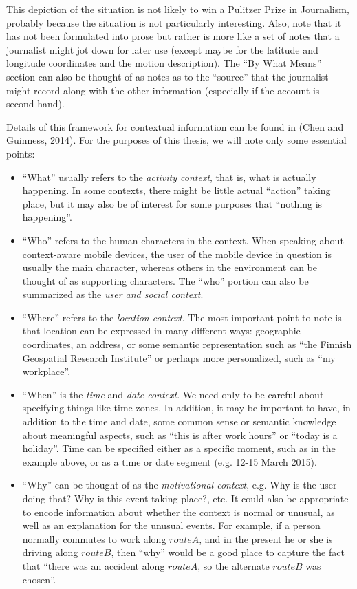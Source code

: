 This depiction of the situation is not likely to win a Pulitzer Prize in Journalism, probably because the situation is not particularly interesting. Also, note that it has not been formulated into prose but rather is more like a set of notes that a journalist might jot down for later use (except maybe for the latitude and longitude coordinates and the motion description). The ``By What Means'' section can also be thought of as notes as to the ``source'' that the journalist might record along with the other information (especially if the account is second-hand).

Details of this framework for contextual information can be found in (Chen and Guinness, 2014). For the purposes of this thesis, we will note only some essential points:
%
\begin{itemize}
\item ``What'' usually refers to the \emph{activity context}, that is, what is actually happening. In some contexts, there might be little actual ``action'' taking place, but it may also be of interest for some purposes that ``nothing is happening''.
% 
\item ``Who'' refers to the human characters in the context. When speaking about context-aware mobile devices, the user of the mobile device in question is usually the main character, whereas others in the environment can be thought of as supporting characters. The ``who'' portion can also be summarized as the \emph{user and social context}. 
%
\item ``Where'' refers to the \emph{location context}. The most important point to note is that location can be expressed in many different ways: geographic coordinates, an address, or some semantic representation such as ``the Finnish Geospatial Research Institute'' or perhaps more personalized, such as ``my workplace''.
%
\item ``When'' is the \emph{time} and \emph{date context}. We need only to be careful about specifying things like time zones. In addition, it may be important to have, in addition to the time and date, some common sense or semantic knowledge about meaningful aspects, such as ``this is after work hours'' or ``today is a holiday''. Time can be specified either as a specific moment, such as in the example above, or as a time or date segment (e.g. 12-15 March 2015).
%
\item ``Why'' can be thought of as the \emph{motivational context}, e.g. Why is the user doing that? Why is this event taking place?, etc. It could also be appropriate to encode information about whether the context is normal or unusual, as well as an explanation for the unusual events. For example, if a person normally commutes to work along $route A$, and in the present he or she is driving along $route B$, then ``why'' would be a good place to capture the fact that ``there was an accident along $route A$, so the alternate $route B$ was chosen''.

\end{itemize}
